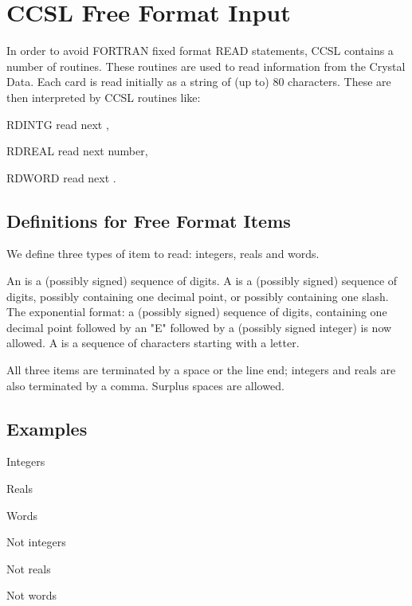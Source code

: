 \section{CCSL Free Format Input}
In order to avoid FORTRAN fixed format READ
statements, CCSL contains a number of  routines. 
These routines are used to read information from the Crystal Data.
Each card is read initially as a string of (up
to) 80 characters. These are then interpreted by CCSL
routines like:
\p
\begin{list} {} {\setlength{\labelwidth}{2cm}
  \setlength{\parsep}{-1ex}
  \setlength{\leftmargin}{\labelwidth}
 \addtolength{\leftmargin}{2 cm}}
\item[RDINTG \hfill] read next ,
\item[RDREAL \hfill] read next  number,
\item[RDWORD \hfill] read next .\end{list}
\subsection{Definitions for Free Format Items}
We define three types of item to read: integers, reals and words.
\p\begin{varindent}{2cm}
An  is a (possibly signed) sequence of digits.
\p 
A  is a (possibly signed) sequence of digits, possibly containing
one decimal point, or possibly containing one slash. The exponential format:
a (possibly signed) sequence of digits, containing
one decimal point followed by an "E" followed by a (possibly signed integer)
is now allowed.
\p 
A  is a sequence of characters starting with a letter.
\end{varindent}\p 
All three items are terminated by a space or the line end;
integers and reals are also
terminated by a comma.  Surplus spaces are allowed.
\p
\subsection{Examples}
\begin{list} {} {\setlength{\labelwidth}{3 cm}
  \setlength{\parsep}{-1ex}
  \setlength{\leftmargin}{\labelwidth}}
\item[Integers \hfill] 
\item[Reals \hfill] 
\item[Words \hfill] 
\item[Not integers \hfill] 
\item[Not reals \hfill] 
\item[Not words \hfill] \end{list}
\p 
